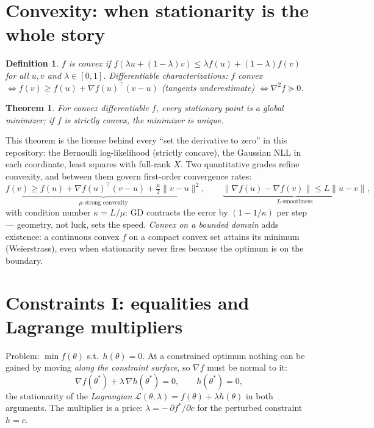 \documentclass[11pt]{article}
\newtheorem{theorem}{Theorem}
\newtheorem{definition}{Definition}
\begin{document}
\section{Convexity: when stationarity is the whole story}

\begin{definition}
$f$ is \emph{convex} if
$f(\lambda u + (1-\lambda)v) \le \lambda f(u) + (1-\lambda) f(v)$ for all
$u,v$ and $\lambda\in[0,1]$. Differentiable characterizations: $f$ convex
$\iff f(v) \ge f(u) + \nabla f(u)^\top (v-u)$ (tangents underestimate)
$\iff \nabla^2 f \succeq 0$.
\end{definition}

\begin{theorem}
For convex differentiable $f$, every stationary point is a \emph{global}
minimizer; if $f$ is strictly convex, the minimizer is unique.
\end{theorem}

This theorem is the license behind every ``set the derivative to zero''
in this repository: the Bernoulli log-likelihood (strictly concave), the
Gaussian NLL in each coordinate, least squares with full-rank $X$.
Two quantitative grades refine convexity, and between them govern
first-order convergence rates:
\begin{equation}
  \underbrace{f(v) \ge f(u) + \nabla f(u)^\top(v-u)
  + \tfrac{\mu}{2}\lVert v-u\rVert^2}_{\text{$\mu$-strong convexity}},
  \qquad
  \underbrace{\lVert\nabla f(u)-\nabla f(v)\rVert
  \le L \lVert u-v\rVert}_{\text{$L$-smoothness}},
  \label{eq:strongsmooth}
\end{equation}
with condition number $\kappa = L/\mu$: GD contracts the error by
$(1-1/\kappa)$ per step --- geometry, not luck, sets the speed.
\emph{Convex on a bounded domain} adds existence: a continuous convex $f$
on a compact convex set attains its minimum (Weierstrass), even when
stationarity never fires because the optimum is on the boundary.

\section{Constraints I: equalities and Lagrange multipliers}

Problem: $\min f(\theta)$ s.t.\ $h(\theta)=0$. At a constrained optimum
nothing can be gained by moving \emph{along the constraint surface}, so
$\nabla f$ must be normal to it:
\begin{equation}
  \nabla f(\theta^\ast) + \lambda\, \nabla h(\theta^\ast) = 0,
  \qquad h(\theta^\ast) = 0 ,
  \label{eq:lagrange}
\end{equation}
the stationarity of the \emph{Lagrangian}
$\mathcal{L}(\theta,\lambda) = f(\theta) + \lambda h(\theta)$ in both
arguments. The multiplier is a price: $\lambda = -\,\partial
f^\ast/\partial c$ for the perturbed constraint $h = c$.
\end{document}
